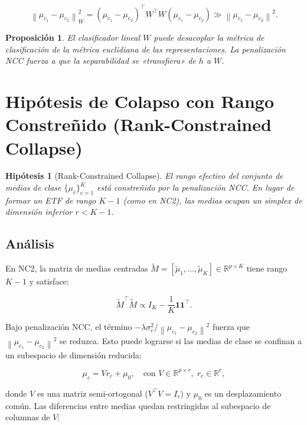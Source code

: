 \documentclass[12pt,a4paper]{report}
\newtheorem{proposition}{Proposición}[chapter]
\newtheorem{hypothesis}{Hipótesis}[chapter]
\newcommand{\R}{\mathbb{R}}
\newcommand{\norm}[1]{\left\lVert#1\right\rVert}
\begin{document}
\begin{equation}
    \norm{\mu_{c_1} - \mu_{c_2}}^2_W = (\mu_{c_1} - \mu_{c_2})^\top W^\top W (\mu_{c_1} - \mu_{c_2}) \gg \norm{\mu_{c_1} - \mu_{c_2}}^2.
\end{equation}

\begin{proposition}
El clasificador lineal $W$ puede desacoplar la métrica de clasificación de la métrica euclidiana de las representaciones. La penalización NCC fuerza a que la separabilidad se «transfiera» de $h$ a $W$.
\end{proposition}

\section{Hipótesis de Colapso con Rango Constreñido (Rank-Constrained Collapse)}
\label{sec:rank}

\begin{hypothesis}[Rank-Constrained Collapse]
El rango efectivo del conjunto de medias de clase $\{\mu_c\}_{c=1}^K$ está constreñido por la penalización NCC. En lugar de formar un ETF de rango $K-1$ (como en NC2), las medias ocupan un simplex de dimensión inferior $r < K-1$.
\end{hypothesis}

\subsection{Análisis}

En NC2, la matriz de medias centradas $\tilde{M} = [\tilde{\mu}_1, \ldots, \tilde{\mu}_K] \in \R^{p \times K}$ tiene rango $K-1$ y satisface:

\begin{equation}
    \tilde{M}^\top \tilde{M} \propto I_K - \frac{1}{K}\mathbf{1}\mathbf{1}^\top.
\end{equation}

Bajo penalización NCC, el término $-\lambda \sigma_c^2/\norm{\mu_{c_1} - \mu_{c_2}}^2$ fuerza que $\norm{\mu_{c_1} - \mu_{c_2}}^2$ se reduzca. Esto puede lograrse si las medias de clase se confinan a un subespacio de dimensión reducida:

\begin{equation}
    \mu_c = V r_c + \mu_0, \quad \text{con } V \in \R^{p \times r}, \; r_c \in \R^r,
\end{equation}

donde $V$ es una matriz semi-ortogonal ($V^\top V = I_r$) y $\mu_0$ es un desplazamiento común. Las diferencias entre medias quedan restringidas al subespacio de columnas de $V$:
\end{document}
